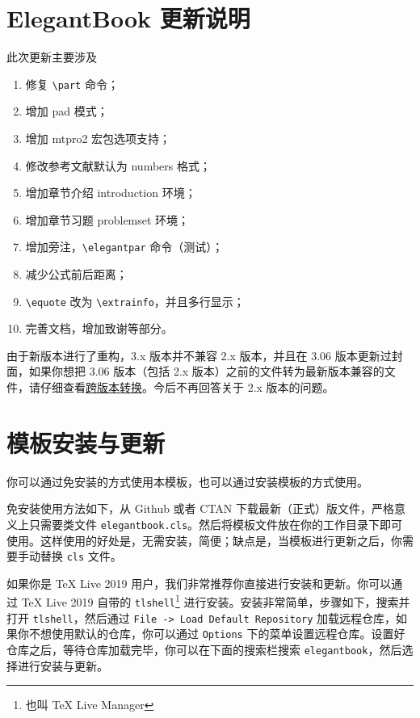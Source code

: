 \documentclass[cn,11pt]{elegantbook}
\begin{document}
\section{ElegantBook 更新说明}
此次更新主要涉及
\begin{enumerate}
\item 修复 \lstinline|\part| 命令；
\item 增加 pad 模式；
\item 增加 mtpro2 宏包选项支持；
\item 修改参考文献默认为 numbers 格式；
\item 增加章节介绍 introduction 环境；
\item 增加章节习题 problemset 环境；
\item 增加旁注，\lstinline{\elegantpar} 命令（测试）；
\item 减少公式前后距离；
\item \lstinline{\equote} 改为 \lstinline{\extrainfo}，并且多行显示；
\item 完善文档，增加致谢等部分。
\end{enumerate}

\begin{note}
由于新版本进行了重构，3.x 版本并不兼容 2.x 版本，并且在 3.06 版本更新过封面，如果你想把 3.06 版本（包括 2.x 版本）之前的文件转为最新版本兼容的文件，请仔细查看\href{https://github.com/ElegantLaTeX/ElegantBook/wiki/convert}{跨版本转换}。今后不再回答关于 2.x 版本的问题。
\end{note}

\section{模板安装与更新}
你可以通过免安装的方式使用本模板，也可以通过安装模板的方式使用。

免安装使用方法如下，从 Github 或者 CTAN 下载最新（正式）版文件，严格意义上只需要类文件 \lstinline{elegantbook.cls}。然后将模板文件放在你的工作目录下即可使用。这样使用的好处是，无需安装，简便；缺点是，当模板进行更新之后，你需要手动替换 \lstinline{cls} 文件。

如果你是 \TeX{} Live 2019 用户，我们非常推荐你直接进行安装和更新。你可以通过 \TeX{} Live 2019 自带的 \lstinline{tlshell}\footnote{也叫 \TeX{} Live Manager} 进行安装。安装非常简单，步骤如下，搜索并打开 \lstinline{tlshell}，然后通过 \lstinline{File -> Load Default Repository} 加载远程仓库，如果你不想使用默认的仓库，你可以通过 \lstinline{Options} 下的菜单设置远程仓库。设置好仓库之后，等待仓库加载完毕，你可以在下面的搜索栏搜索 \lstinline{elegantbook}，然后选择进行安装与更新。
\end{document}
